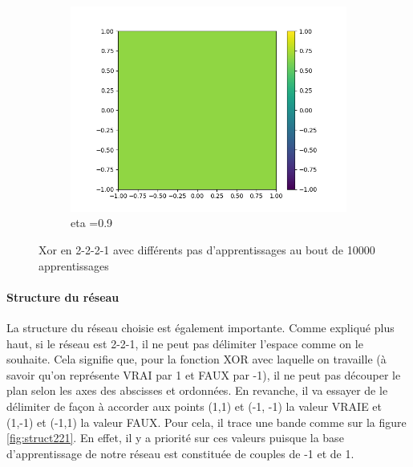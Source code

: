 \begin{figure}[h!]
\begin{subfigure}[b]{.3\linewidth}
    \includegraphics[width=\linewidth]{fig/xor2221_eta09.png}
    \caption{eta =0.9}
  \end{subfigure}
  \caption{Xor en 2-2-2-1 avec différents pas d'apprentissages au bout de 10000 apprentissages}
  \label{fig:2_2_2_1}
\end{figure}

\paragraph{Structure du réseau}
	La structure du réseau choisie est également importante. Comme expliqué plus haut, si le réseau est 2-2-1, il ne peut pas délimiter l'espace comme on le souhaite. Cela signifie que, pour la fonction XOR avec laquelle on travaille (à savoir qu'on représente VRAI par 1 et FAUX par -1), il ne peut pas découper le plan selon les axes des abscisses et ordonnées. En revanche, il va essayer de le délimiter de façon à accorder aux points (1,1) et (-1, -1) la valeur VRAIE et (1,-1) et (-1,1) la valeur FAUX. Pour cela, il trace une bande comme sur la figure \ref{fig:struct221}. En effet, il y a priorité sur ces valeurs puisque la base d'apprentissage de notre réseau est constituée de couples de -1 et de 1.
	
